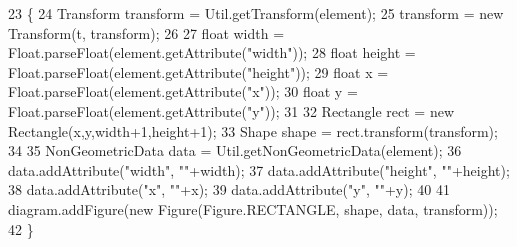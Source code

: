 \begin{DoxyCode}
23                                                                                                            
         \{
24         Transform transform = Util.getTransform(element);
25         transform = \textcolor{keyword}{new} Transform(t, transform); 
26         
27         \textcolor{keywordtype}{float} width = Float.parseFloat(element.getAttribute(\textcolor{stringliteral}{"width"}));
28         \textcolor{keywordtype}{float} height = Float.parseFloat(element.getAttribute(\textcolor{stringliteral}{"height"}));
29         \textcolor{keywordtype}{float} x = Float.parseFloat(element.getAttribute(\textcolor{stringliteral}{"x"}));
30         \textcolor{keywordtype}{float} y = Float.parseFloat(element.getAttribute(\textcolor{stringliteral}{"y"}));
31         
32         Rectangle rect = \textcolor{keyword}{new} Rectangle(x,y,width+1,height+1);
33         Shape shape = rect.transform(transform);
34         
35         NonGeometricData data = Util.getNonGeometricData(element);
36         data.addAttribute(\textcolor{stringliteral}{"width"}, \textcolor{stringliteral}{""}+width);
37         data.addAttribute(\textcolor{stringliteral}{"height"}, \textcolor{stringliteral}{""}+height);
38         data.addAttribute(\textcolor{stringliteral}{"x"}, \textcolor{stringliteral}{""}+x);
39         data.addAttribute(\textcolor{stringliteral}{"y"}, \textcolor{stringliteral}{""}+y);
40         
41         diagram.addFigure(\textcolor{keyword}{new} Figure(Figure.RECTANGLE, shape, data, transform));
42     \}
\end{DoxyCode}
